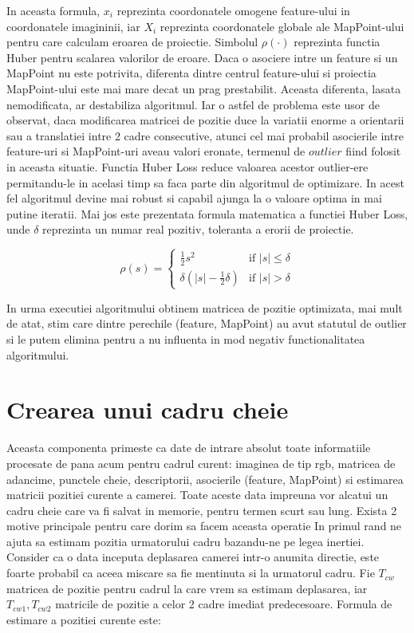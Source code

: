 \documentclass[12pt,a4paper]{report}
\begin{document}
In aceasta formula, \(x_i\) reprezinta coordonatele omogene feature-ului in coordonatele imagininii,
iar \(X_i\) reprezinta coordonatele globale ale MapPoint-ului pentru care calculam eroarea
de proiectie. Simbolul $ \rho(\cdot) $ reprezinta functia Huber pentru scalarea valorilor de eroare.
Daca o asociere intre un feature si un MapPoint nu este potrivita, diferenta dintre centrul feature-ului
si proiectia MapPoint-ului este mai mare decat un prag prestabilit. Aceasta diferenta, lasata nemodificata,
ar destabiliza algoritmul. Iar o astfel de problema este usor de observat, daca modificarea matricei
de pozitie duce la variatii enorme a orientarii sau a translatiei intre 2 cadre consecutive, 
atunci cel mai probabil asocierile intre feature-uri si MapPoint-uri aveau valori eronate, 
termenul de \(outlier\) fiind folosit in aceasta situatie. Functia Huber Loss reduce 
valoarea acestor outlier-ere permitandu-le in acelasi timp sa faca parte din algoritmul de 
optimizare. In acest fel algoritmul devine mai robust si capabil ajunga la o valoare optima 
in mai putine iteratii. Mai jos este prezentata formula matematica a functiei Huber Loss, 
unde $ \delta $ reprezinta un numar real pozitiv, toleranta a erorii de proiectie. 

\begin{equation}
\rho(s) =
\begin{cases}
\frac{1}{2}s^2 & \text{if } |s| \leq \delta \\
\delta (|s| - \frac{1}{2}\delta) & \text{if } |s| > \delta
\end{cases}
\end{equation}

In urma executiei algoritmului obtinem matricea de pozitie optimizata, mai mult de atat,
stim care dintre perechile (feature, MapPoint) au avut statutul de outlier si le putem 
elimina pentru a nu influenta in mod negativ functionalitatea algoritmului.

\section{Crearea unui cadru cheie}
Aceasta componenta primeste ca date de intrare absolut toate informatiile procesate de 
pana acum pentru cadrul curent: imaginea de tip rgb, matricea de adancime, punctele cheie,
descriptorii, asocierile (feature, MapPoint) si estimarea matricii pozitiei curente a camerei.
Toate aceste data impreuna vor alcatui un cadru cheie care va fi salvat in memorie, pentru 
termen scurt sau lung. Exista 2 motive principale pentru care dorim sa facem aceasta operatie
In primul rand ne ajuta sa estimam pozitia urmatorului cadru bazandu-ne pe legea inertiei. 
Consider ca o data inceputa deplasarea camerei intr-o anumita directie, este foarte 
probabil ca aceea miscare sa fie mentinuta si la urmatorul cadru. Fie \(T_{cw}\) matricea de 
pozitie pentru cadrul la care vrem sa estimam deplasarea, iar \(T_{cw1}, T_{cw2} \) matricile 
de pozitie a celor 2 cadre imediat predecesoare. Formula de estimare a pozitiei curente este:
\end{document}

